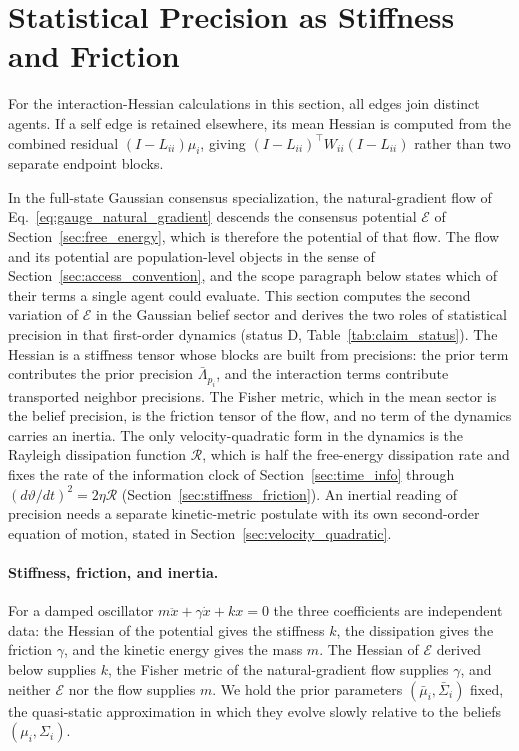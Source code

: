 \section{Statistical Precision as Stiffness and Friction}\label{sec:mass}

For the interaction-Hessian calculations in this section, all edges join distinct agents. If a self edge is retained elsewhere, its mean Hessian is computed from the combined residual $(I-L_{ii})\mu_i$, giving $(I-L_{ii})^\top W_{ii}(I-L_{ii})$ rather than two separate endpoint blocks.


In the full-state Gaussian consensus specialization, the natural-gradient flow of Eq.~\eqref{eq:gauge_natural_gradient} descends the consensus potential $\mathcal{E}$ of Section~\ref{sec:free_energy}, which is therefore the potential of that flow. The flow and its potential are population-level objects in the sense of Section~\ref{sec:access_convention}, and the scope paragraph below states which of their terms a single agent could evaluate. This section computes the second variation of $\mathcal{E}$ in the Gaussian belief sector and derives the two roles of statistical precision in that first-order dynamics (status D, Table~\ref{tab:claim_status}). The Hessian is a stiffness tensor whose blocks are built from precisions: the prior term contributes the prior precision $\bar{\Lambda}_{p_i}$, and the interaction terms contribute transported neighbor precisions. The Fisher metric, which in the mean sector is the belief precision, is the friction tensor of the flow, and no term of the dynamics carries an inertia. The only velocity-quadratic form in the dynamics is the Rayleigh dissipation function $\mathcal{R}$, which is half the free-energy dissipation rate and fixes the rate of the information clock of Section~\ref{sec:time_info} through $(d\vartheta/dt)^2 = 2\eta\mathcal{R}$ (Section~\ref{sec:stiffness_friction}). An inertial reading of precision needs a separate kinetic-metric postulate with its own second-order equation of motion, stated in Section~\ref{sec:velocity_quadratic}.

\paragraph{Stiffness, friction, and inertia.} For a damped oscillator $m\ddot{x} + \gamma\dot{x} + kx = 0$ the three coefficients are independent data: the Hessian of the potential gives the stiffness $k$, the dissipation gives the friction $\gamma$, and the kinetic energy gives the mass $m$. The Hessian of $\mathcal{E}$ derived below supplies $k$, the Fisher metric of the natural-gradient flow supplies $\gamma$, and neither $\mathcal{E}$ nor the flow supplies $m$. We hold the prior parameters $(\bar{\mu}_i, \bar{\Sigma}_i)$ fixed, the quasi-static approximation in which they evolve slowly relative to the beliefs $(\mu_i, \Sigma_i)$.

